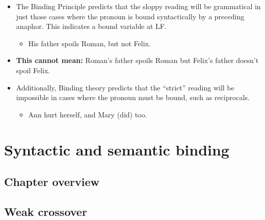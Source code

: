 \documentclass[a4paper]{article}
\begin{document}
\begin{itemize}
\item The Binding Principle predicts that the sloppy reading will be grammatical in just those cases where the pronoun is bound syntactically by a preceding anaphor. This indicates a bound variable at LF. 
\begin{itemize}
\item His father spoils Roman, but not Felix. 
\end{itemize}
\item \textbf{This cannot mean:} Roman's father spoils Roman but Felix's father doesn't spoil Felix.  
\item Additionally, Binding theory predicts that the ``strict'' reading will be impossible in cases where the pronoun must be bound, such as reciprocals.
\begin{itemize}
\item Ann hurt herself, and Mary (did) too.
\end{itemize}
\end{itemize}
			
\section{Syntactic and semantic binding}

\subsection{Chapter overview}

\subsection{Weak crossover}
\end{document}
